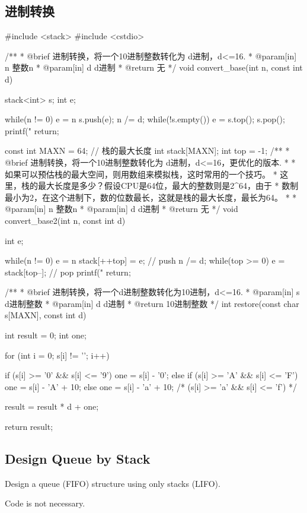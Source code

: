 \subsection{进制转换}
\begin{Codex}[label=convert_base.cpp]
#include <stack>
#include <cstdio>

 /**
  * @brief 进制转换，将一个10进制整数转化为 d进制，d<=16.
  * @param[in] n 整数n
  * @param[in] d d进制
  * @return 无
  */
void convert_base(int n, const int d) {
    stack<int> s;
    int e;

    while(n != 0) {
        e = n %
        s.push(e);
        n /= d;
    }
    while(!s.empty()) {
        e = s.top();
        s.pop();
        printf("%
    }
    return;
}

const int MAXN = 64; // 栈的最大长度
int stack[MAXN];
int top = -1;
/**
 * @brief 进制转换，将一个10进制整数转化为 d进制，d<=16，更优化的版本.
 *
 * 如果可以预估栈的最大空间，则用数组来模拟栈，这时常用的一个技巧。
 * 这里，栈的最大长度是多少？假设CPU是64位，最大的整数则是2^64，由于
 * 数制最小为2，在这个进制下，数的位数最长，这就是栈的最大长度，最长为64。
 *
 * @param[in] n 整数n
 * @param[in] d d进制
 * @return 无
 */
void convert_base2(int n, const int d) {
    int e;

    while(n != 0) {
        e = n %
        stack[++top] = e; // push
        n /= d;
    }
    while(top >= 0) {
        e = stack[top--]; // pop
        printf("%
    }
    return;
}


/**
 * @brief 进制转换，将一个d进制整数转化为10进制，d<=16.
 * @param[in] s d进制整数
 * @param[in] d d进制
 * @return 10进制整数
 */
int restore(const char s[MAXN], const int d) {
    int result = 0;
    int one;

    for (int i = 0; s[i] != '\0'; i++) {
        if (s[i] >= '0' && s[i] <= '9') one = s[i] - '0';
        else if (s[i] >= 'A' && s[i] <= 'F') one = s[i] - 'A' + 10;
        else one = s[i] - 'a' + 10; /* (s[i] >= 'a' && s[i] <= 'f') */
        
        result = result * d + one;
    }
    return result;
}
\end{Codex}


\subsection{Design Queue by Stack}
Design a queue (FIFO) structure using only stacks (LIFO). 

Code is not necessary. 

